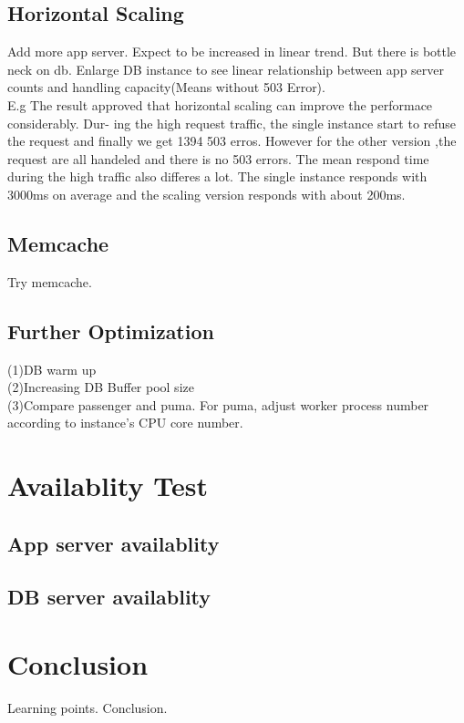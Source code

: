 \documentclass[dvips,12pt]{article}
\begin{document}
\subsection{Horizontal Scaling}
Add more app server. Expect to be increased in linear trend. But there is bottle neck on db. Enlarge DB instance to see linear relationship between app server counts and handling capacity(Means without 503 Error). \\
E.g
The result approved that horizontal scaling can improve the performace considerably. Dur- ing the high request traffic, the single instance start to refuse the request and finally we get 1394 503 erros. However for the other version ,the request are all handeled and there is no 503 errors. The mean respond time during the high traffic also differes a lot. The single instance responds with 3000ms on average and the scaling version responds with about 200ms.

\subsection{Memcache}
Try memcache.

\subsection{Further Optimization}
(1)DB warm up \\
(2)Increasing DB Buffer pool size \\
(3)Compare passenger and puma. For puma, adjust worker process number according to instance's CPU core number. 

\newpage

\section{Availablity Test}
\subsection{App server availablity}
\subsection{DB server availablity}
\newpage

\section{Conclusion}
Learning points. Conclusion.
\end{document}
